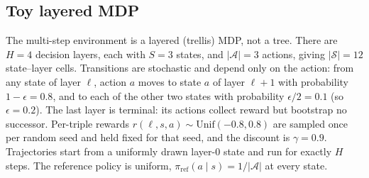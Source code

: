 \subsection{Toy layered MDP}
\label{app:toy-mdp}

The multi-step environment is a layered (trellis) MDP, not a tree. There are $H=4$ decision
layers, each with $S=3$ states, and $|\mathcal{A}|=3$ actions, giving $|\mathcal{S}|=12$
state--layer cells. Transitions are stochastic and depend only on the action: from any state of
layer $\ell$, action $a$ moves to state $a$ of layer $\ell+1$ with probability $1-\epsilon=0.8$,
and to each of the other two states with probability $\epsilon/2=0.1$ (so $\epsilon=0.2$). The
last layer is terminal: its actions collect reward but bootstrap no successor. Per-triple rewards
$r(\ell,s,a)\sim\mathrm{Unif}(-0.8,0.8)$ are sampled once per random seed and held fixed for that
seed, and the discount is $\gamma=0.9$. Trajectories start from a uniformly drawn layer-$0$ state
and run for exactly $H$ steps. The reference policy is uniform,
$\pi_{\mathrm{ref}}(a\mid s)=1/|\mathcal{A}|$ at every state.

